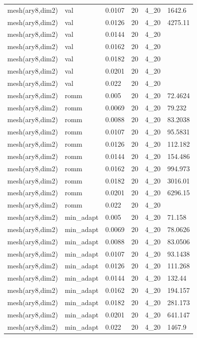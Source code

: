 \begin{longtable}[H]{llllll}
mesh(ary8,dim2) & val        & 0.0107 & 20 & 4\_20 & 1642.6  \\
mesh(ary8,dim2) & val        & 0.0126 & 20 & 4\_20 & 4275.11 \\
mesh(ary8,dim2) & val        & 0.0144 & 20 & 4\_20 &         \\
mesh(ary8,dim2) & val        & 0.0162 & 20 & 4\_20 &         \\
mesh(ary8,dim2) & val        & 0.0182 & 20 & 4\_20 &         \\
mesh(ary8,dim2) & val        & 0.0201 & 20 & 4\_20 &         \\
mesh(ary8,dim2) & val        & 0.022  & 20 & 4\_20 &         \\ \hline
mesh(ary8,dim2) & romm       & 0.005  & 20 & 4\_20 & 72.4624 \\
mesh(ary8,dim2) & romm       & 0.0069 & 20 & 4\_20 & 79.232  \\
mesh(ary8,dim2) & romm       & 0.0088 & 20 & 4\_20 & 83.2038 \\
mesh(ary8,dim2) & romm       & 0.0107 & 20 & 4\_20 & 95.5831 \\
mesh(ary8,dim2) & romm       & 0.0126 & 20 & 4\_20 & 112.182 \\
mesh(ary8,dim2) & romm       & 0.0144 & 20 & 4\_20 & 154.486 \\
mesh(ary8,dim2) & romm       & 0.0162 & 20 & 4\_20 & 994.973 \\
mesh(ary8,dim2) & romm       & 0.0182 & 20 & 4\_20 & 3016.01 \\
mesh(ary8,dim2) & romm       & 0.0201 & 20 & 4\_20 & 6296.15 \\
mesh(ary8,dim2) & romm       & 0.022  & 20 & 4\_20 &         \\ \hline
mesh(ary8,dim2) & min\_adapt & 0.005  & 20 & 4\_20 & 71.158  \\
mesh(ary8,dim2) & min\_adapt & 0.0069 & 20 & 4\_20 & 78.0626 \\
mesh(ary8,dim2) & min\_adapt & 0.0088 & 20 & 4\_20 & 83.0506 \\
mesh(ary8,dim2) & min\_adapt & 0.0107 & 20 & 4\_20 & 93.1438 \\
mesh(ary8,dim2) & min\_adapt & 0.0126 & 20 & 4\_20 & 111.268 \\
mesh(ary8,dim2) & min\_adapt & 0.0144 & 20 & 4\_20 & 132.44  \\
mesh(ary8,dim2) & min\_adapt & 0.0162 & 20 & 4\_20 & 194.157 \\
mesh(ary8,dim2) & min\_adapt & 0.0182 & 20 & 4\_20 & 281.173 \\
mesh(ary8,dim2) & min\_adapt & 0.0201 & 20 & 4\_20 & 641.147 \\
mesh(ary8,dim2) & min\_adapt & 0.022  & 20 & 4\_20 & 1467.9 
\end{longtable}

